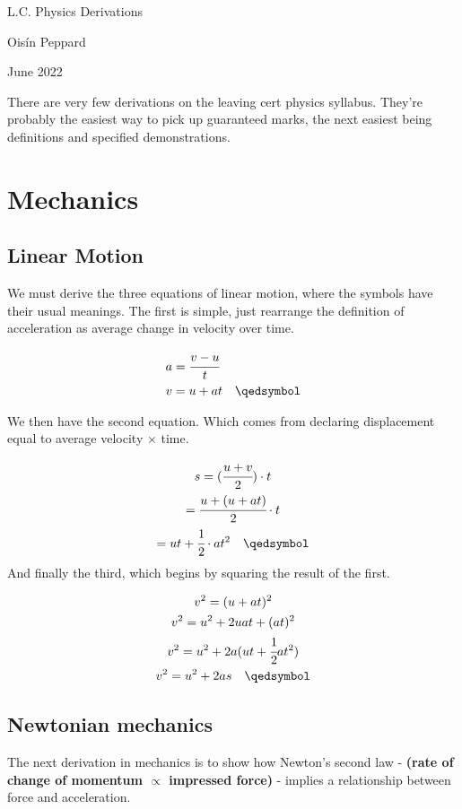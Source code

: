 \documentclass[10pt,a4paper]{article}
\newcommand{\Title}[1]{\begin{center}\textcolor{navi}{\begin{Huge}#1\vspace{1pt}\end{Huge}}\end{center}}
\newcommand{\SubTitle}[1]{\begin{center}\textcolor{navi}{#1\vspace{1pt}}\end{center}}
\begin{document}
\Title{L.C. Physics Derivations}
\SubTitle{Oisín Peppard}
\SubTitle{June 2022}
\hrulefill

There are very few derivations on the leaving cert physics syllabus. They're probably the easiest way to pick up guaranteed marks, the next easiest being definitions and specified demonstrations.

\section{Mechanics}

\subsection{Linear Motion}
We must derive the three equations of linear motion, where the symbols have their usual meanings. The first is simple, just rearrange the definition of acceleration as average change in velocity over time.

\begin{align*}
    a &= \cfrac{v-u}{t} \\
    v &= u + at 
    \quad \qedsymbol
\end{align*}

We then have the second equation. Which comes from declaring displacement equal to average velocity $\times$ time.

\begin{gather*}
    s = (\cfrac{u + v}{2}) \cdot t \\
    = \cfrac{u + (u + at)}{2} \cdot t \\
    = ut + \cfrac{1}{2} \cdot at^2
    \quad \qedsymbol
\end{gather*} 
And finally the third, which begins by squaring the result of the first.

\begin{gather*}
    v^2 = (u + at)^2 \\
    v^2 = u^2 + 2uat + (at)^2 \\
    v^2 = u^2 + 2a(ut + \cfrac{1}{2}at^2) \\
    v^2 = u^2 +2as
    \quad \qedsymbol
\end{gather*}

\newpage
\subsection{Newtonian mechanics}
The next derivation in mechanics is to show how Newton's second law - \textbf{(rate of change of momentum $\propto$ impressed force)} - implies a relationship between force and acceleration.
\end{document}
